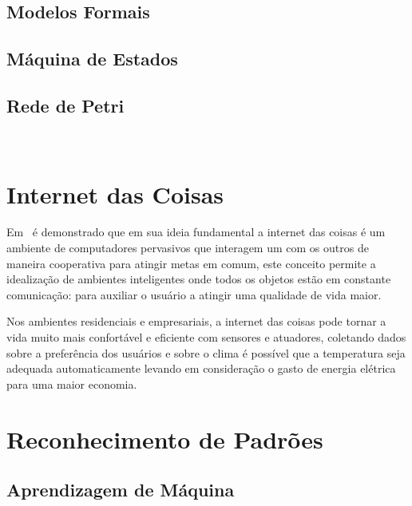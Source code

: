 \subsection{Modelos Formais}
\subsection{Máquina de Estados}
\subsection{Rede de Petri}
~\cite{VALK:2002}

\section{Internet das Coisas}

Em~\cite{ATZORI:2010} é demonstrado que em sua ideia fundamental a internet das coisas é um ambiente de computadores pervasivos que interagem um com os outros de maneira cooperativa para atingir metas em comum, este conceito permite a idealização de ambientes inteligentes onde todos os objetos estão em constante comunicação: para auxiliar o usuário a atingir uma qualidade de vida maior.

Nos ambientes residenciais e empresariais, a internet das coisas pode tornar a vida muito mais confortável e eficiente com sensores e atuadores, coletando dados sobre a preferência dos usuários e sobre o clima é possível que a temperatura seja adequada automaticamente levando em consideração o gasto de energia elétrica para uma maior economia.

\section{Reconhecimento de Padrões}
\subsection{Aprendizagem de Máquina}
